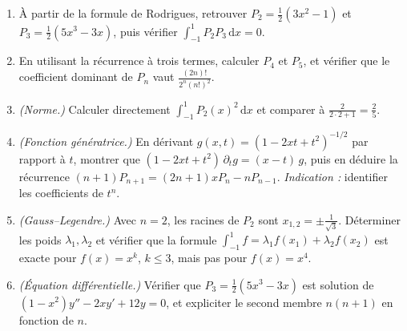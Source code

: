 \begin{mdframed}[style=exobar]
  \begin{enumerate}
    \item À partir de la formule de Rodrigues, retrouver
          $P_2=\tfrac{1}{2}(3x^2-1)$ et $P_3=\tfrac{1}{2}(5x^3-3x)$, puis
          vérifier $\int_{-1}^1 P_2 P_3\,\mathrm{d}x=0$.

    \item En utilisant la récurrence à trois termes, calculer $P_4$ et $P_5$,
          et vérifier que le coefficient dominant de $P_n$ vaut
          $\frac{(2n)!}{2^n{(n!)}^2}$.

    \item \textit{(Norme.)} Calculer directement
          $\int_{-1}^1 {P_2(x)}^2\,\mathrm{d}x$ et comparer à
          $\frac{2}{2\cdot 2+1}=\frac{2}{5}$.

    \item \textit{(Fonction génératrice.)} En dérivant
          $g(x,t)={(1-2xt+t^2)}^{-1/2}$ par rapport à $t$, montrer que
          $(1-2xt+t^2)\,\partial_t g=(x-t)\,g$, puis en déduire la
          récurrence $(n+1)P_{n+1}=(2n+1)xP_n-nP_{n-1}$.
          \textit{Indication :} identifier les coefficients de $t^n$.

    \item \textit{(Gauss--Legendre.)} Avec $n=2$, les racines de $P_2$ sont
          $x_{1,2}=\pm\frac{1}{\sqrt 3}$. Déterminer les poids $\lambda_1,
          \lambda_2$ et vérifier que la formule
          $\int_{-1}^1 f=\lambda_1 f(x_1)+\lambda_2 f(x_2)$ est exacte pour
          $f(x)=x^k$, $k\leq 3$, mais pas pour $f(x)=x^4$.

    \item \textit{(Équation différentielle.)} Vérifier que
          $P_3=\tfrac{1}{2}(5x^3-3x)$ est solution de
          $(1-x^2)y''-2xy'+12y=0$, et expliciter le second membre $n(n+1)$
          en fonction de $n$.
  \end{enumerate}
\end{mdframed}

